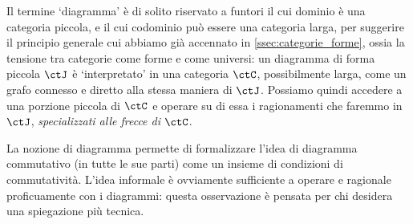 \begin{remark}
 Il termine `diagramma' è di solito riservato a funtori il cui dominio è una categoria piccola, e il cui codominio può essere una categoria larga, per suggerire il principio generale cui abbiamo già accennato in \ref{ssec:categorie_forme}, ossia la tensione tra categorie come forme e come universi: un diagramma di forma piccola \(\ctJ\) è `interpretato' in una categoria \(\ctC\), possibilmente larga, come un grafo connesso e diretto alla stessa maniera di \(\ctJ\). Possiamo quindi accedere a una porzione piccola di \(\ctC\) e operare su di essa i ragionamenti che faremmo in \(\ctJ\), \emph{specializzati alle frecce di \(\ctC\)}.
\end{remark}
La nozione di diagramma permette di formalizzare l'idea di diagramma commutativo (in tutte le sue parti) come un insieme di condizioni di commutatività. L'idea informale è ovviamente sufficiente a operare e ragionale proficuamente con i diagrammi: questa osservazione è pensata per chi desidera una spiegazione più tecnica.
